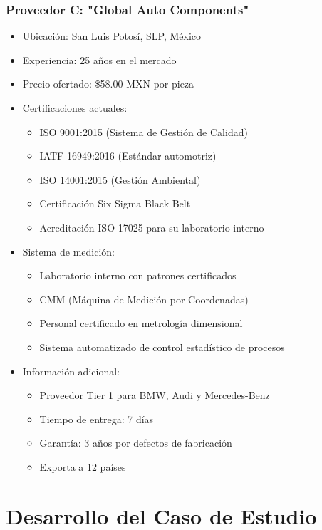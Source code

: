 \documentclass{article}
\begin{document}
\subsubsection*{Proveedor C: "Global Auto Components"}
\begin{itemize}
    \item Ubicación: San Luis Potosí, SLP, México
    \item Experiencia: 25 años en el mercado
    \item Precio ofertado: \$58.00 MXN por pieza
    \item Certificaciones actuales:
    \begin{itemize}
        \item ISO 9001:2015 (Sistema de Gestión de Calidad)
        \item IATF 16949:2016 (Estándar automotriz)
        \item ISO 14001:2015 (Gestión Ambiental)
        \item Certificación Six Sigma Black Belt
        \item Acreditación ISO 17025 para su laboratorio interno
    \end{itemize}
    \item Sistema de medición:
    \begin{itemize}
        \item Laboratorio interno con patrones certificados
        \item CMM (Máquina de Medición por Coordenadas)
        \item Personal certificado en metrología dimensional
        \item Sistema automatizado de control estadístico de procesos
    \end{itemize}
    \item Información adicional:
    \begin{itemize}
        \item Proveedor Tier 1 para BMW, Audi y Mercedes-Benz
        \item Tiempo de entrega: 7 días
        \item Garantía: 3 años por defectos de fabricación
        \item Exporta a 12 países
    \end{itemize}
\end{itemize}

\section*{Desarrollo del Caso de Estudio}
\end{document}
